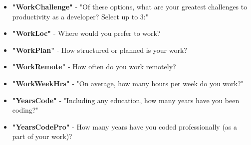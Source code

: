 \begin{appendices}
\begin{itemize}
        \item \textbf{"WorkChallenge"} - "Of these options, what are your greatest challenges to productivity as a developer? Select up to 3:"
        \item \textbf{"WorkLoc"} - Where would you prefer to work?
        \item \textbf{"WorkPlan"} - How structured or planned is your work?
        \item \textbf{"WorkRemote"} - How often do you work remotely?
        \item \textbf{"WorkWeekHrs"} - "On average, how many hours per week do you work?"
        \item \textbf{"YearsCode"} - "Including any education, how many years have you been coding?"
        \item \textbf{"YearsCodePro"} - How many years have you coded professionally (as a part of your work)?
    \end{itemize}
\end{appendices}
\thispagestyle{normal}
